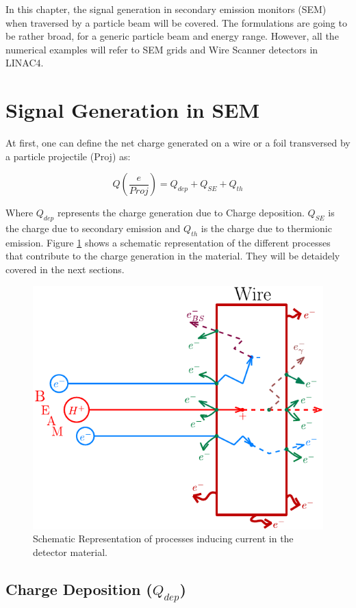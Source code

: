 \pagestyle{fancy}

\graphicspath{ {Figures/Chapter3_IntensitySimulation/} }

In this chapter, the signal generation in secondary emission monitors (SEM) when traversed by a particle beam will be covered. The formulations are going to be rather broad, for a generic particle beam and energy range. However, all the numerical examples will refer to SEM grids and Wire Scanner detectors in LINAC4. 

\section{Signal Generation in SEM}

At first, one can define the net charge generated on a wire or a foil transversed by a particle projectile (Proj) as: 

\begin{equation}
    \label{eq:Qsum}
    Q\left(\frac{e}{Proj}\right) = Q_{dep} + Q_{SE} + Q_{th}
\end{equation}

Where $Q_{dep}$ represents the charge generation due to Charge deposition. $Q_{SE}$ is the charge due to secondary emission and $Q_{th}$ is the charge due to thermionic emission. Figure \ref{fig:SignalGeneration} shows a schematic representation of the different processes that contribute to the charge generation in the material. They will be detaidely covered in the next sections. 

\begin{figure}[h]
    \centering
    \includegraphics[width=0.50\columnwidth]{Figure_ChargeGeneration/ChargeGen.pdf}
    \caption{Schematic Representation of processes inducing current in the detector material.}
    \label{fig:SignalGeneration}
\end{figure}

\subsection{Charge Deposition ($Q_{dep}$)}

